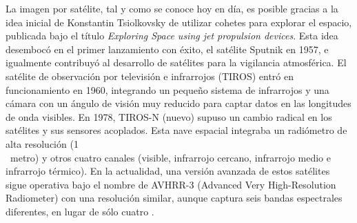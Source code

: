La imagen por satélite, tal y como se conoce hoy en día, es posible gracias a la idea inicial de Konstantin Tsiolkovsky de utilizar cohetes para explorar el espacio, publicada bajo el título \textit{Exploring Space using jet propulsion devices}. Esta idea desembocó en el primer lanzamiento con éxito, el satélite Sputnik en 1957, e igualmente contribuyó al desarrollo de satélites para la vigilancia atmosférica. El satélite de observación por televisión e infrarrojos (TIROS) entró en funcionamiento en 1960, integrando un pequeño sistema de infrarrojos y una cámara con un ángulo de visión muy reducido para captar datos en las longitudes de onda visibles. En 1978, TIROS-N (nuevo) supuso un cambio radical en los satélites y sus sensores acoplados. Esta nave espacial integraba un radiómetro de alta resolución (1 \si{\kilo\\metro}) y otros cuatro canales (visible, infrarrojo cercano, infrarrojo medio e infrarrojo térmico). En la actualidad, una versión avanzada de estos satélites sigue operativa bajo el nombre de AVHRR-3 (Advanced Very High-Resolution Radiometer) con una resolución similar, aunque captura seis bandas espectrales diferentes, en lugar de sólo cuatro \cite{national_oceanic_and_atmospheric_administration_avhrr3_nodate}.   

